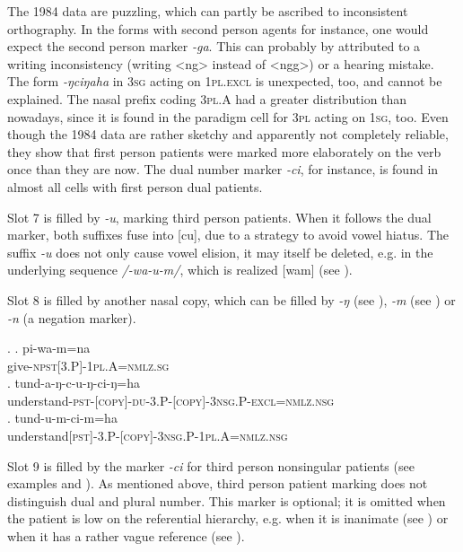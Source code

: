 The 1984 data are puzzling, which can partly be ascribed to inconsistent orthography. In the forms with second person agents for instance, one would expect the second person marker \emph{-ga}. This can probably by attributed to a writing inconsistency (writing <ng> instead of <ngg>) or a hearing mistake. The form \emph{-ŋciŋaha} in {\scshape 3sg} acting on {\scshape 1pl.excl} is unexpected, too, and cannot be explained. The nasal prefix coding {\scshape 3pl.A} had a greater distribution than nowadays, since it is found in the paradigm cell for {\scshape 3pl} acting on {\scshape 1sg}, too. Even though the 1984 data are rather sketchy and apparently not completely reliable, they show that first person patients were marked more elaborately on the verb once than they are now. The dual number marker \emph{-ci}, for instance, is found in almost all cells with first person dual patients. 

Slot 7 is filled by  \emph{-u}, marking third person patients. When it follows the dual marker, both suffixes fuse into [cu], due to a strategy to avoid vowel hiatus. The suffix \emph{-u} does not only cause vowel elision, it may itself be deleted, e.g. in the underlying sequence \emph{/-wa-u-m/}, which is realized [wam] (see \Next[a]). 

Slot 8 is filled by another nasal copy, which can be filled by \emph{-ŋ} (see \Next[b]), \emph{-m} (see \Next[c]) or \emph{-n} (a negation marker).

\ex. \ag. pi-wa-m=na\\
	give{\scshape -npst[3.P]-1pl.A=nmlz.sg}\\
	\bg.	tund-a-ŋ-c-u-ŋ-ci-ŋ=ha\\
	understand{\scshape -pst-[copy]-du-3.P-[copy]-3nsg.P-excl=nmlz.nsg}\\
	\bg.	tund-u-m-ci-m=ha\\
	understand{\scshape [pst]-3.P-[copy]-3nsg.P-1pl.A=nmlz.nsg}\\

	
Slot 9  is filled by the marker \emph{-ci} for third person nonsingular patients (see examples \Last[b] and \Last[c]). As mentioned above, third person  patient marking does not distinguish dual and plural number. This marker is optional; it is omitted when the patient is low on the referential hierarchy, e.g. when it is inanimate (see \Next[a]) or when it has a rather vague reference (see \Next[b]). 



